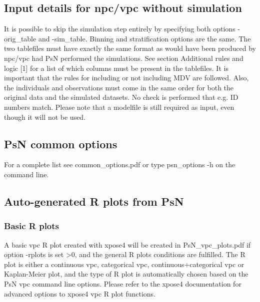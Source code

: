 \subsection{Input details for npc/vpc without simulation}
It is possible to skip the simulation step entirely by specifying both options -orig\_table and -sim\_table.  Binning and stratification options are the same. The two tablefiles must have exactly the same format as would have been produced by npc/vpc had PsN performed the simulations. See section Additional rules and logic [1] for a list of which columns must be present in the tablefiles. It is important that the rules for including or not including MDV are followed. Also, the individuals and observations must come in the same order for both the original data and the simulated datasets. No check is performed that e.g. ID numbers match. Please note that a modelfile is still required as input, even though it will not be used.


\subsection{PsN common options}
For a complete list see common\_options.pdf or type psn\_options -h on the command line. 

\subsection{Auto-generated R plots from PsN}
\newcommand{\rplotsconditions}{The default vpc template requires the xpose4 R library to be installed. If the conditions are not fulfilled then no pdf will be generated, see the .Rout file in the main run directory for error messages.} 

\subsubsection*{Basic R plots}
A basic vpc R plot created with xpose4 will be created in PsN\_vpc\_plots.pdf if option -rplots is set >0, and the general R plots conditions are fulfilled.
The R plot is either a continuous vpc, categorical vpc, continuous+categorical vpc or Kaplan-Meier plot, and the type of R plot is automatically chosen based on the PsN vpc command line options.
Please refer to the xpose4 documentation for advanced options to xpose4 vpc R plot functions.

